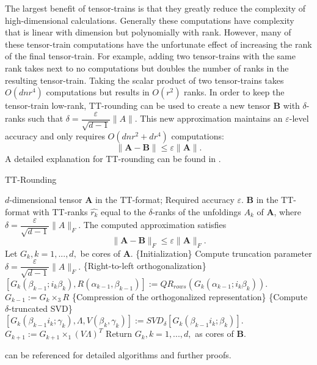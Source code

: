 The largest benefit of tensor-trains is that they greatly reduce the complexity of high-dimensional calculations. Generally these computations have complexity that is linear with dimension but polynomially with rank. However, many of these tensor-train computations have the unfortunate effect of increasing the rank of the final tensor-train. For example, adding two tensor-trains with the same rank takes next to no computations but doubles the number of ranks in the resulting tensor-train. Taking the scalar product of two tensor-trains takes $O(dnr^4)$ computations but results in $O(r^2)$ ranks. In order to keep the tensor-train low-rank, TT-rounding can be used to create a new tensor $\textbf{B}$ with $\delta$-ranks such that $\delta = \dfrac{\varepsilon}{\sqrt{d-1}}\| A\|$. This new approximation maintains an $\varepsilon$-level accuracy and only requires $O(dnr^2+dr^4)$ computations:
\begin{equation}
\| \textbf{A}-\textbf{B}\| \leq \varepsilon \| \textbf{A} \|.
\end{equation}
A detailed explanation for TT-rounding can be found in . \cite{Osel1}
\begin{algorithm}
\caption{TT-Rounding \cite{Osel1}}\label{ttround}
\begin{algorithmic}[1]
	\Require $d$-dimensional tensor \textbf{A} in the TT-format; Required accuracy $\varepsilon$.
	\Ensure \textbf{B} in the TT-format with TT-ranks $\hat{r_k}$ equal to the $\delta$-ranks of the unfoldings $A_k$ of \textbf{A}, where $\delta = \dfrac{\varepsilon}{\sqrt{d-1}}\|A\|_F.$ The computed approximation satisfies
	\begin{equation*}
	\| \textbf{A}-\textbf{B}\|_F \leq \varepsilon\|\textbf{A}\|_F.
	\end{equation*}
	\State Let $G_k, k = 1,...,d,$ be cores of \textbf{A}. 
	\State \{Initialization\}
	\Statex	Compute truncation parameter $\delta = \dfrac{\varepsilon}{\sqrt{d-1}}\|A\|_F.$
	\State \{Right-to-left orthogonalization\} 
	 \do{}
		\State $[G_k(\beta_{k-1};i_k\beta_k),R(\alpha_{k-1},\beta_{k-1})] := QR_{rows}(G_k(\alpha_{k-1};i_k\beta_k)).$
		\State $G_{k-1} := G_k \times_3 R$
	\EndFor
	\State \{Compression of the orthogonalized representation\}
	 \do{}
		\State \{Compute $\delta$-truncated SVD\}
		\Statex $[G_k(\beta_{k-1}i_k;\gamma_k),\Lambda,V(\beta_k,\gamma_k)] := SVD_\delta[G_k(\beta_{k-1}i_k;\beta_k)].$
		\State $G_{k+1} := G_{k+1} \times_1 (V\Lambda)^T$
	\EndFor
	\State Return $G_k, k = 1,...,d,$ as cores of \textbf{B}.
\end{algorithmic}
\end{algorithm}

\cite{Osel1,Osel2} can be referenced for detailed algorithms and further proofs.